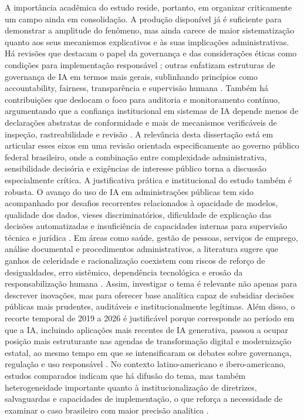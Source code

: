 \documentclass[12pt,a4paper]{article}
\begin{document}
A importância acadêmica do estudo reside, portanto, em organizar criticamente um campo ainda em consolidação. A produção disponível já é suficiente para demonstrar a amplitude do fenômeno, mas ainda carece de maior sistematização quanto aos seus mecanismos explicativos e às suas implicações administrativas. Há revisões que destacam o papel da governança e das considerações éticas como condições para implementação responsável \autocite{serra2024a}; outras enfatizam estruturas de governança de IA em termos mais gerais, sublinhando princípios como accountability, fairness, transparência e supervisão humana \autocite{batool2025ai} \autocite{sigfrids2022how}. Também há contribuições que deslocam o foco para auditoria e monitoramento contínuo, argumentando que a confiança institucional em sistemas de IA depende menos de declarações abstratas de conformidade e mais de mecanismos verificáveis de inspeção, rastreabilidade e revisão \autocite{mkander2023auditing} \autocite{minkkinen2022continuous}. A relevância desta dissertação está em articular esses eixos em uma revisão orientada especificamente ao governo público federal brasileiro, onde a combinação entre complexidade administrativa, sensibilidade decisória e exigências de interesse público torna a discussão especialmente crítica.
A justificativa prática e institucional do estudo também é robusta. O avanço do uso de IA em administrações públicas tem sido acompanhado por desafios recorrentes relacionados à opacidade de modelos, qualidade dos dados, vieses discriminatórios, dificuldade de explicação das decisões automatizadas e insuficiência de capacidades internas para supervisão técnica e jurídica \autocite{brkan2020legal} \autocite{parycek2023artificial}. Em áreas como saúde, gestão de pessoas, serviços de emprego, análise documental e procedimentos administrativos, a literatura sugere que ganhos de celeridade e racionalização coexistem com riscos de reforço de desigualdades, erro sistêmico, dependência tecnológica e erosão da responsabilização humana \autocite{lemes2020o} \autocite{cho2023human} \autocite{krtner2021predictive} \autocite{chilunjika2022artificial} \autocite{barros2025inteligencia}. Assim, investigar o tema é relevante não apenas para descrever inovações, mas para oferecer base analítica capaz de subsidiar decisões públicas mais prudentes, auditáveis e institucionalmente legítimas.
Além disso, o recorte temporal de 2019 a 2026 é justificável porque corresponde ao período em que a IA, incluindo aplicações mais recentes de IA generativa, passou a ocupar posição mais estruturante nas agendas de transformação digital e modernização estatal, ao mesmo tempo em que se intensificaram os debates sobre governança, regulação e uso responsável \autocite{lyrio2025emerging} \autocite{mariano2026inteligencia}. No contexto latino-americano e ibero-americano, estudos comparados indicam que há difusão do tema, mas também heterogeneidade importante quanto à institucionalização de diretrizes, salvaguardas e capacidades de implementação, o que reforça a necessidade de examinar o caso brasileiro com maior precisão analítica \autocite{criado2024inteligencia}.
\end{document}
